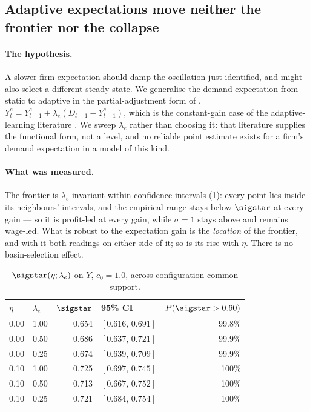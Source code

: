 \subsection{Adaptive expectations move neither the frontier nor the collapse}
\label{sec:expectations}

\paragraph{The hypothesis.} A slower firm expectation should damp the
oscillation just identified, and might also select a different steady state.
We generalise the demand expectation from static to adaptive in the
partial-adjustment form of \citet{Nerlove1958},
$Y^e_t = Y^e_{t-1} + \lambda_e (D_{t-1} - Y^e_{t-1})$, which is the
constant-gain case of the adaptive-learning literature
\citep{EvansHonkapohja2001}. We sweep $\lambda_e$ rather than choosing it: that
literature supplies the functional form, not a level, and no reliable point
estimate exists for a firm's demand expectation in a model of this kind.

\paragraph{What was measured.} The frontier is $\lambda_e$-invariant within
confidence intervals (\cref{tab:expectations}): every point lies inside its
neighbours' intervals, and the empirical range stays below $\sigstar$ at every
gain --- so it is profit-led at every gain, while $\sigma = 1$ stays above and
remains wage-led. What is robust to the expectation gain is the \emph{location}
of the frontier, and with it both readings on either side of it; so is its rise
with $\eta$. There is no basin-selection effect.

\begin{table}[htbp]
\centering
\small
\caption{$\sigstar(\eta;\lambda_e)$ on $Y$, $c_0 = 1.0$, across-configuration
common support.}
\label{tab:expectations}
\begin{tabular}{llrlr}
\toprule
$\eta$ & $\lambda_e$ & $\sigstar$ & 95\% CI & $P(\sigstar > 0.60)$\\
\midrule
0.00 & 1.00 & 0.654 & $[0.616,\,0.691]$ & 99.8\%\\
0.00 & 0.50 & 0.686 & $[0.637,\,0.721]$ & 99.9\%\\
0.00 & 0.25 & 0.674 & $[0.639,\,0.709]$ & 99.9\%\\
0.10 & 1.00 & 0.725 & $[0.697,\,0.745]$ & 100\%\\
0.10 & 0.50 & 0.713 & $[0.667,\,0.752]$ & 100\%\\
0.10 & 0.25 & 0.721 & $[0.684,\,0.754]$ & 100\%\\
\bottomrule
\end{tabular}
\end{table}

